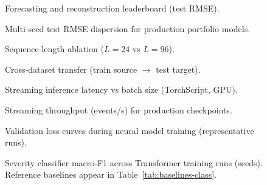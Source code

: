 
\begin{figure}[H]
  \caption{Forecasting and reconstruction leaderboard (test RMSE).}
  \label{fig:neural-forecast-rmse}
\end{figure}

\begin{figure}[H]
  \caption{Multi-seed test RMSE dispersion for production portfolio models.}
  \label{fig:neural-multiseed}
\end{figure}

\begin{figure}[H]
  \caption{Sequence-length ablation ($L=24$ vs $L=96$).}
  \label{fig:seq-ablation}
\end{figure}

\begin{figure}[H]
  \caption{Cross-dataset transfer (train source $\rightarrow$ test target).}
  \label{fig:cross-transfer}
\end{figure}

\begin{figure}[H]
  \caption{Streaming inference latency vs batch size (TorchScript, GPU).}
  \label{fig:streaming-latency}
\end{figure}

\begin{figure}[H]
  \caption{Streaming throughput (events/s) for production checkpoints.}
  \label{fig:streaming-throughput}
\end{figure}

\begin{figure}[H]
  \caption{Validation loss curves during neural model training (representative runs).}
  \label{fig:validation-curves}
\end{figure}

\begin{figure}[H]
  \caption{Severity classifier macro-F1 across Transformer training runs (seeds). Reference baselines appear in Table~\ref{tab:baselines-class}.}
  \label{fig:neural-classification-f1}
\end{figure}
